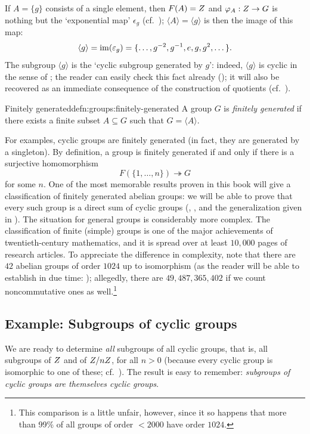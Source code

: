If $A = \{g\}$ consists of a single element, then $F(A) = Z$ and
$\varphi_A : Z \to G$ is nothing but the `exponential map'
$\epsilon_g$ (cf.\ );
$\langle A \rangle = \langle g \rangle$ is then the image of this map:
\[
  \langle g \rangle = \operatorname{im}(\varepsilon_g) = \{\dots, g^{-2}, g^{-1}, e,
  g, g^2, \dots\}.
\]
The subgroup $\langle g \rangle$ is the `cyclic subgroup generated by
$g$': indeed, $\langle g \rangle$ is cyclic in the sense of
; the reader can easily check this fact
already (); it will also be
recovered as an immediate consequence of the construction of quotients
(cf.\ ).

\begin{defn}{Finitely generated}{defn:groups:finitely-generated}
  A group $G$ is \emph{finitely generated} if there exists a finite
  subset $A \subseteq G$ such that $G = \langle A \rangle$.
\end{defn}

For examples, cyclic groups are finitely generated (in fact, they are
generated by a singleton). By definition, a group is finitely
generated if and only if there is a surjective homomorphism
\[
  F(\{1, \dots, n\}) \twoheadrightarrow G
\]
for some $n$. One of the most memorable results proven in this book
will give a classification of finitely generated abelian groups: we
will be able to prove that every such group is a direct sum of cyclic
groups (,
,
and the generalization given in ). The situation for
general groups is considerably more complex. The classification of
finite (simple) groups is one of the major achievements of
twentieth-century mathematics, and it is spread over at least
$10{,}000$ pages of research articles. To appreciate the difference in
complexity, note that there are $42$ abelian groups of order $1024$ up
to isomorphism (as the reader will be able to establish in due time:
); allegedly, there are
$49{,}487{,}365{,}402$ if we count noncommutative ones as
well.\footnote{This comparison is a little unfair, however, since it
  so happens that more than 99\% of all groups of order ${}<2000$ have
  order $1024$.}

\subsection{Example: Subgroups of cyclic groups}
\label{subsec:groups:example-subgroups-of-cyclic-groups}
We are ready to determine \emph{all} subgroups of all cyclic groups,
that is, all subgroups of $Z$ and of $Z/nZ$, for all $n > 0$
(because every cyclic group is isomorphic to one of these; cf.\
). The result is easy to remember:
\emph{subgroups of cyclic groups are themselves cyclic groups}.

